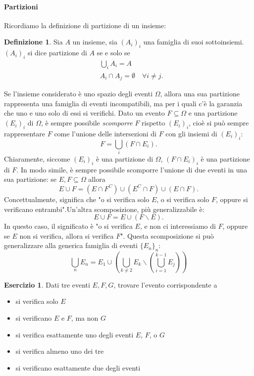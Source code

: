 \documentclass{article}
\theoremstyle{plain}
\theoremstyle{definition}
\newtheorem{definizione}{Definizione}[section]
\newtheorem{esercizio}{Esercizio}[section]
\theoremstyle{remark}
\begin{document}
\paragraph{Partizioni} %
\label{par:partizioni}
Ricordiamo la definizione di partizione di un insieme:
\begin{definizione}
	Sia $A$ un insieme, sia $(A_i)_i$ una famiglia di suoi sottoinsiemi. $(A_i)_i$ si dice partizione di $A$ se e solo se
	\begin{align*}
		&\bigcup_i A_i =A\\
		&A_i\cap A_j =\emptyset \quad\forall i\not =j\text{.}
	\end{align*}
\end{definizione}
Se l'insieme considerato è uno spazio degli eventi $\Omega$, allora una sua partizione rappresenta una famiglia di eventi incompatibili, ma per i quali c'è la garanzia che uno e uno solo di essi si verifichi. Dato un evento $F\subseteq\Omega$ e una partizione $(E_i)_i$ di $\Omega$, è sempre possibile \textit{scomporre} $F$ rispetto $(E_i)_i$, cioè si può sempre rappresentare $F$ come l'unione delle intersezioni di $F$ con gli insiemi di $(E_i)_i$:
\begin{equation*}
	F=\bigcup_i (F\cap E_i)\text{.}
\end{equation*}
Chiaramente, siccome $(E_i)_i$ è una partizione di $\Omega$, $(F\cap E_i)_i$ è una partizione di $F$. In modo simile, è sempre possibile scomporre l'unione di due eventi in una sua partizione: se $E,F\subseteq\Omega$ allora
\begin{equation*}
	E\cup F=(E\cap F^C)\cup(E^C\cap F)\cup (E\cap F)\text{.}
\end{equation*}
Concettualmente, significa che "o si verifica solo $E$, o si verifica solo $F$, oppure si verificano entrambi".Un'altra scomposizione, più generalizzabile è:
\begin{equation*}
	E\cup F=E\cup(F\smallsetminus E)\text{.}
\end{equation*}
In questo caso, il significato è "o si verifica $E$, e non ci interessiamo di $F$, oppure se $E$ non si verifica, allora si verifica $F$". Questa scomposizione si può generalizzare alla generica famiglia di eventi $\{E_n\}_n$:
\begin{equation*}%
	\bigcup_n E_n=E_1 \cup(\bigcup_{k\neq2} E_k\smallsetminus(\bigcup_{i=1}^{k-1} E_j))
\end{equation*}
\begin{esercizio}
	Dati tre eventi $E,F,G$, trovare l'evento corrispondente a
	\begin{itemize}
		\item si verifica solo $E$
		\item si verificano $E$ e $F$, ma non $G$
		\item si verifica esattamente uno degli eventi $E$, $F$, o $G$
		\item si verifica almeno uno dei tre
		\item si verificano esattamente due degli eventi
	\end{itemize}
\end{esercizio}
\end{document}
